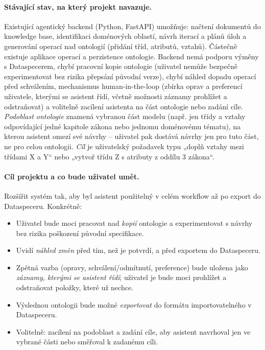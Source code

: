 \documentclass{article}
\begin{document}
\paragraph{Stávající stav, na který projekt navazuje.}
Existující agentický backend (Python, FastAPI) umožňuje: načtení dokumentů do knowledge base, identifikaci doménových oblastí, návrh iterací a plánů úloh a generování operací nad ontologií (přidání tříd, atributů, vztahů). Částečně existuje aplikace operací a perzistence ontologie. Backend nemá podporu výměny s Dataspecerem, chybí pracovní kopie ontologie (uživatel nemůže bezpečně experimentovat bez rizika přepsání původní verze), chybí náhled dopadu operací před schválením, mechanismus human-in-the-loop (zbírka oprav a preferencí uživatele, kterými se asistent řídí, včetně možnosti záznamy prohlížet a odstraňovat) a volitelně zacílení asistenta na část ontologie nebo zadání cíle. \emph{Podoblast ontologie} znamená vybranou část modelu (např. jen třídy a vztahy odpovídající jedné kapitole zákona nebo jednomu doménovému tématu), na kterou asistent omezí své návrhy -- uživatel pak dostává návrhy jen pro tuto část, ne pro celou ontologii. \emph{Cíl} je uživatelský požadavek typu „doplň vztahy mezi třídami X a Y“ nebo „vytvoř třídu Z s atributy z oddílu 3 zákona“.

\paragraph{Cíl projektu a co bude uživatel umět.}
Rozšířit systém tak, aby byl asistent použitelný v celém workflow až po export do Dataspeceru. Konkrétně:
\begin{itemize}
 \item Uživatel bude moci pracovat nad \emph{kopií} ontologie a experimentovat s návrhy bez rizika poškození původní specifikace.
 \item Uvidí \emph{náhled změn} před tím, než je potvrdí, a před exportem do Dataspeceru.
 \item Zpětná vazba (opravy, schválení/odmítnutí, preference) bude uložena jako \emph{záznamy, kterými se asistent řídí}; uživatel je bude moci prohlížet a odstraňovat položky, které už nechce.
 \item Výslednou ontologii bude možné \emph{exportovat} do formátu importovatelného v Dataspeceru.
 \item Volitelně: zacílení na podoblast a zadání cíle, aby asistent navrhoval jen ve vybrané části nebo směřoval k zadanému cíli.
\end{itemize}
\end{document}
